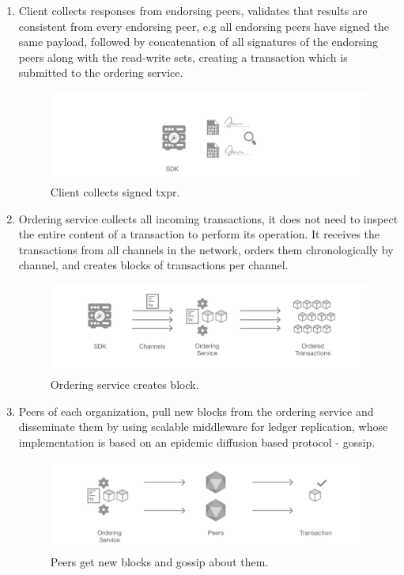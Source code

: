 \begin{enumerate}
    \item Client collects responses from endorsing peers, validates that results are consistent from every endorsing peer, e.g all endorsing peers have signed the same payload, followed by concatenation of all signatures of the endorsing peers along with the read-write sets, creating a transaction which is submitted to the ordering service.
    \begin{figure}[H]
        \centering
        \includegraphics[width=1\textwidth]{images/4_Fabric/step3.png}
        \caption{Client collects signed \acrshort{txpr}.}
        \label{fig:step3}
    \end{figure}
    \item Ordering service collects all incoming transactions, it does not need to inspect the entire content of a transaction to perform its operation. It receives the transactions from all channels in the network, orders them chronologically by channel, and creates blocks of transactions per channel.
    \begin{figure}[H]
        \centering
        \includegraphics[width=1\textwidth]{images/4_Fabric/step4.png}
        \caption{Ordering service creates block.}
        \label{fig:step4}
    \end{figure}
    
    \item Peers of each organization, pull new blocks from the ordering service and disseminate them by using scalable middleware for ledger replication, whose implementation is based on an epidemic diffusion based protocol - gossip.
     \begin{figure}[H]
        \centering
        \includegraphics[width=1\textwidth]{images/4_Fabric/step5.png}
        \caption{Peers get new blocks and gossip about them.}
        \label{fig:step5}
    \end{figure}
    

\end{enumerate}
